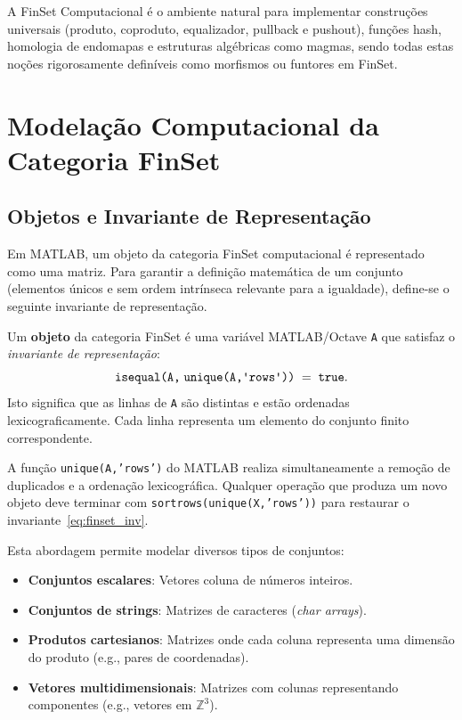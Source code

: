 A FinSet Computacional é o ambiente natural para implementar
construções universais (produto, coproduto, equalizador, pullback
e pushout), funções hash, homologia de endomapas e estruturas
algébricas como magmas, sendo todas estas noções rigorosamente
definíveis como morfismos ou funtores em FinSet.

\section{Modelação Computacional da Categoria FinSet}

\subsection{Objetos e Invariante de Representação}

Em MATLAB, um objeto da categoria FinSet computacional é
representado como uma matriz. Para garantir a definição
matemática de um conjunto (elementos únicos e sem ordem
intrínseca relevante para a igualdade), define-se o seguinte
invariante de representação.

\begin{definition}
	Um \textbf{objeto} da categoria FinSet é uma variável
	MATLAB/Octave \texttt{A} que satisfaz o
	\emph{invariante de representação}:
	\begin{equation}
		\texttt{isequal(A,\;unique(A,\textquotesingle rows\textquotesingle))}
		\;=\; \texttt{true}.
		\label{eq:finset_inv}
	\end{equation}
	Isto significa que as linhas de \texttt{A} são distintas e estão
	ordenadas lexicograficamente. Cada linha representa um elemento
	do conjunto finito correspondente.
\end{definition}

\begin{remark}
	A função \texttt{unique(A,'rows')} do MATLAB realiza
	simultaneamente a remoção de duplicados e a ordenação
	lexicográfica. Qualquer operação que produza um novo objeto
	deve terminar com \texttt{sortrows(unique(X,'rows'))} para
	restaurar o invariante~\eqref{eq:finset_inv}.
\end{remark}

Esta abordagem permite modelar diversos tipos de conjuntos:
\begin{itemize}
	\item \textbf{Conjuntos escalares}: Vetores coluna de números
	inteiros.
	\item \textbf{Conjuntos de strings}: Matrizes de caracteres
	(\textit{char arrays}).
	\item \textbf{Produtos cartesianos}: Matrizes onde cada coluna
	representa uma dimensão do produto (e.g., pares de
	coordenadas).
	\item \textbf{Vetores multidimensionais}: Matrizes com colunas
	representando componentes (e.g., vetores em $\mathbb{Z}^3$).
\end{itemize}

